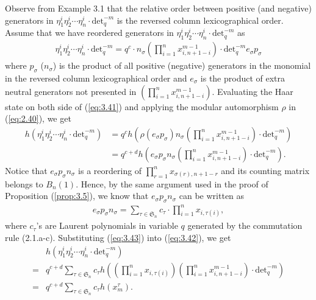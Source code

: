 \documentclass[table,a4paper,reqno]{amsart}
\numberwithin{equation}{section}
\theoremstyle{definition}
\begin{document}
Observe from Example 3.1 that the relative order between positive (and negative) generators in $\eta^i_1\eta^i_2\cdots \eta^i_n\cdot\text{det}_q^{-m}$ is the reversed column lexicographical order. Assume that we have reordered generators in $\eta^i_1\eta^i_2\cdots \eta^i_n\cdot\text{det}_q^{-m}$ as
\begin{align}\label{eq:3.41}
    \eta^i_1\eta^i_2\cdots \eta^i_n\cdot\text{det}_q^{-m}=q^c\cdot n_\sigma\left(\prod_{i=1}^nx_{i,n+1-i}^{m-1}\right)\cdot\text{det}_q^{-m} e_\sigma p_\sigma
\end{align}
where $p_\sigma$ ($n_\sigma$) is the product of all positive (negative) generators in the monomial in the reversed column lexicographical order and $e_\sigma$ is the product of extra neutral generators not presented in $\left(\prod_{i=1}^nx_{i,n+1-i}^{m-1}\right)$. Evaluating the Haar state on both side of (\ref{eq:3.41}) and applying the modular automorphism $\rho$ in (\ref{eq:2.40}), we get
\begin{equation}\label{eq:3.42}
    \begin{split}
        h\left(\eta^i_1\eta^i_2\cdots \eta^i_n\cdot\text{det}_q^{-m}\right)&=q^c h\left(\rho(e_\sigma p_\sigma)n_\sigma\left(\prod_{i=1}^nx_{i,n+1-i}^{m-1}\right)\cdot\text{det}_q^{-m}\right)\\
        &=q^{c+d} h\left(e_\sigma p_\sigma n_\sigma\left(\prod_{i=1}^nx_{i,n+1-i}^{m-1}\right)\cdot\text{det}_q^{-m}\right).
    \end{split}
\end{equation}
Notice that $e_\sigma p_\sigma n_\sigma$ is a reordering of $\prod_{r=1}^nx_{\sigma(r),n+1-r}$ and its counting matrix belongs to $B_n(1)$. Hence, by the same argument used in the proof of Proposition (\ref{prop:3.5}), we know that $e_\sigma p_\sigma n_\sigma$ can be written as 
\begin{equation}\label{eq:3.43}
    \begin{split}
        e_\sigma p_\sigma n_\sigma=\sum_{\tau\in\mathfrak{S}_n}c_{\tau}\cdot\prod_{i=1}^nx_{i,\tau(i)},
    \end{split}
\end{equation}
where $c_{\tau}$'s are Laurent polynomials in variable $q$ generated by the commutation rule (2.1.a-c). Substituting (\ref{eq:3.43}) into (\ref{eq:3.42}), we get
\begin{equation}\label{eq:3.44}
    \begin{split}
        &h\left(\eta^i_1\eta^i_2\cdots \eta^i_n\cdot\text{det}_q^{-m}\right)\\
        =&q^{c+d} \sum_{\tau\in\mathfrak{S}_n}c_{\tau} h\left(\left(\prod_{i=1}^nx_{i,\tau(i)}\right)\left(\prod_{i=1}^nx_{i,n+1-i}^{m-1}\right)\cdot\text{det}_q^{-m}\right)\\
        =&q^{c+d} \sum_{\tau\in\mathfrak{S}_n}c_{\tau}h(x^\tau_m).
    \end{split}
\end{equation}
\end{document}
